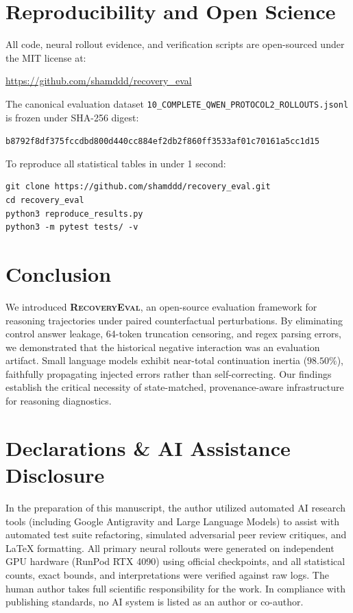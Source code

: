 \documentclass[11pt,letterpaper]{article}
\newcommand{\framework}{\textsc{RecoveryEval}}
\begin{document}
\section{Reproducibility and Open Science}

All code, neural rollout evidence, and verification scripts are open-sourced under the MIT license at:
\begin{center}
\url{https://github.com/shamddd/recovery_eval}
\end{center}
The canonical evaluation dataset \texttt{10\_COMPLETE\_QWEN\_PROTOCOL2\_ROLLOUTS.jsonl} is frozen under SHA-256 digest:
\begin{center}
\texttt{b8792f8df375fccdbd800d440cc884ef2db2f860ff3533af01c70161a5cc1d15}
\end{center}
To reproduce all statistical tables in under 1 second:
\begin{verbatim}
git clone https://github.com/shamddd/recovery_eval.git
cd recovery_eval
python3 reproduce_results.py
python3 -m pytest tests/ -v
\end{verbatim}

\section{Conclusion}

We introduced \textbf{\framework}, an open-source evaluation framework for reasoning trajectories under paired counterfactual perturbations. By eliminating control answer leakage, 64-token truncation censoring, and regex parsing errors, we demonstrated that the historical negative interaction was an evaluation artifact. Small language models exhibit near-total continuation inertia ($98.50\%$), faithfully propagating injected errors rather than self-correcting. Our findings establish the critical necessity of state-matched, provenance-aware infrastructure for reasoning diagnostics.

\section*{Declarations \& AI Assistance Disclosure}
In the preparation of this manuscript, the author utilized automated AI research tools (including Google Antigravity and Large Language Models) to assist with automated test suite refactoring, simulated adversarial peer review critiques, and LaTeX formatting. All primary neural rollouts were generated on independent GPU hardware (RunPod RTX 4090) using official checkpoints, and all statistical counts, exact bounds, and interpretations were verified against raw logs. The human author takes full scientific responsibility for the work. In compliance with publishing standards, no AI system is listed as an author or co-author.
\end{document}
